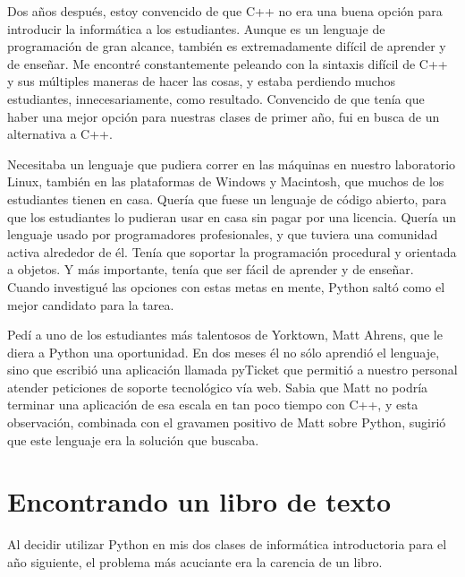 Dos años después, estoy convencido de que C++ no era una buena opción para introducir 
la informática a los estudiantes. Aunque es un lenguaje de programación de gran 
alcance, también es extremadamente difícil de aprender y de enseñar.  Me encontré 
constantemente peleando con la sintaxis difícil de C++ y sus múltiples maneras de
 hacer las cosas, y estaba perdiendo muchos estudiantes, innecesariamente, como resultado. 
Convencido de que tenía que haber una mejor opción para nuestras clases de primer año, fui en busca de un alternativa a C++.
 
Necesitaba un lenguaje que pudiera correr en las máquinas en nuestro laboratorio
Linux, también en las plataformas de Windows y Macintosh, que muchos de los
estudiantes tienen en casa.  Quería que fuese un lenguaje de código abierto, para que
los estudiantes lo pudieran usar en casa sin pagar por una licencia.  Quería un lenguaje
usado por programadores profesionales, y que tuviera una comunidad activa
alrededor de él.  Tenía que soportar la programación procedural y orientada a
objetos.  Y más importante, tenía que ser fácil de aprender y de enseñar.  
Cuando investigué las opciones con estas metas en mente, Python saltó como el
mejor candidato para la tarea. 
 
Pedí a uno de los estudiantes más talentosos de Yorktown, Matt Ahrens, que le
diera a Python una oportunidad.  En dos meses él no sólo aprendió el lenguaje,
sino que  escribió una aplicación llamada pyTicket que permitió a nuestro personal 
atender peticiones de soporte tecnológico vía web.  Sabia que Matt no podría terminar 
una aplicación de esa escala en tan poco tiempo con C++, y esta observación, 
combinada con el gravamen positivo de Matt sobre Python, sugirió que este lenguaje era la solución que buscaba. 
 
\section*{Encontrando un libro de texto}

Al decidir utilizar Python en mis dos clases de informática introductoria para 
el año siguiente, el problema más acuciante era la carencia de un libro.

